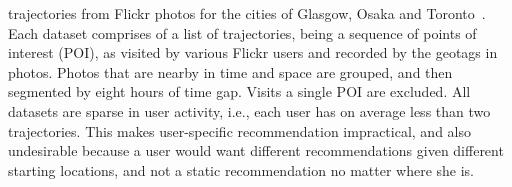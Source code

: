  trajectories from Flickr photos
for the cities of Glasgow, Osaka and Toronto~\cite{thomee2016yfcc100m,ijcai15}.
Each dataset comprises of a
list of trajectories, being a sequence of points of interest (POI), as visited by various Flickr users
and recorded by the geotags in photos. Photos that are nearby in time and space are grouped,  and then segmented by eight hours of time gap. Visits %
a single POI are excluded. 
All datasets are sparse in user activity,
i.e., each user has on average less than two trajectories.
This makes user-specific recommendation impractical, and also undesirable because 
a user would want different recommendations given different starting locations, and not a static recommendation no matter where she is.

